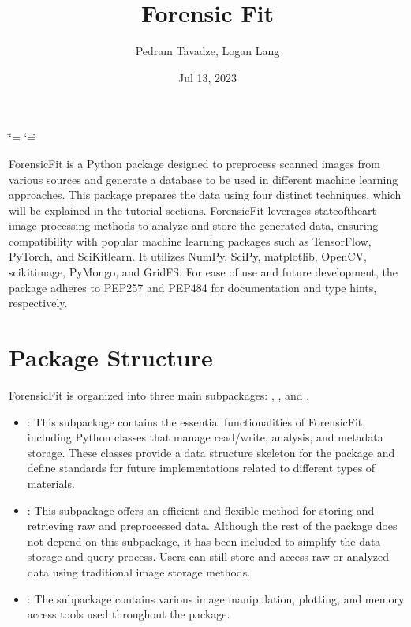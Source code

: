 \documentclass[letterpaper,10pt,english]{sphinxmanual}
\title{Forensic Fit}
\date{Jul 13, 2023}
\author{Pedram Tavadze, Logan Lang}
\begin{document}
\ifdefined\shorthandoff
  \ifnum\catcode`\=\string=\active\shorthandoff{=}\fi
  \ifnum\catcode`\"=\active{}\fi
\fi

\pagestyle{empty}
\sphinxmaketitle
\pagestyle{plain}
\sphinxtableofcontents
\pagestyle{normal}
\label{\detokenize{index::doc}}


\sphinxAtStartPar
ForensicFit is a Python package designed to preprocess scanned images from various sources and generate a database to be used in different machine learning approaches. This package prepares the data using four distinct techniques, which will be explained in the tutorial sections. ForensicFit leverages state\sphinxhyphen{}of\sphinxhyphen{}the\sphinxhyphen{}art image processing methods to analyze and store the generated data, ensuring compatibility with popular machine learning packages such as TensorFlow, PyTorch, and SciKit\sphinxhyphen{}learn. It utilizes NumPy, SciPy, matplotlib, OpenCV, scikit\sphinxhyphen{}image, PyMongo, and GridFS. For ease of use and future development, the package adheres to PEP\sphinxhyphen{}257 and PEP\sphinxhyphen{}484 for documentation and type hints, respectively.


\chapter{Package Structure}
\label{\detokenize{index:package-structure}}
\sphinxAtStartPar
ForensicFit is organized into three main sub\sphinxhyphen{}packages: , , and .
\begin{itemize}
\item {} 
\sphinxAtStartPar
{}: This sub\sphinxhyphen{}package contains the essential functionalities of ForensicFit, including Python classes that manage read/write, analysis, and metadata storage. These classes provide a data structure skeleton for the package and define standards for future implementations related to different types of materials.

\item {} 
\sphinxAtStartPar
{}: This sub\sphinxhyphen{}package offers an efficient and flexible method for storing and retrieving raw and preprocessed data. Although the rest of the package does not depend on this sub\sphinxhyphen{}package, it has been included to simplify the data storage and query process. Users can still store and access raw or analyzed data using traditional image storage methods.

\item {} 
\sphinxAtStartPar
{}: The  sub\sphinxhyphen{}package contains various image manipulation, plotting, and memory access tools used throughout the package.

\end{itemize}
\end{document}
